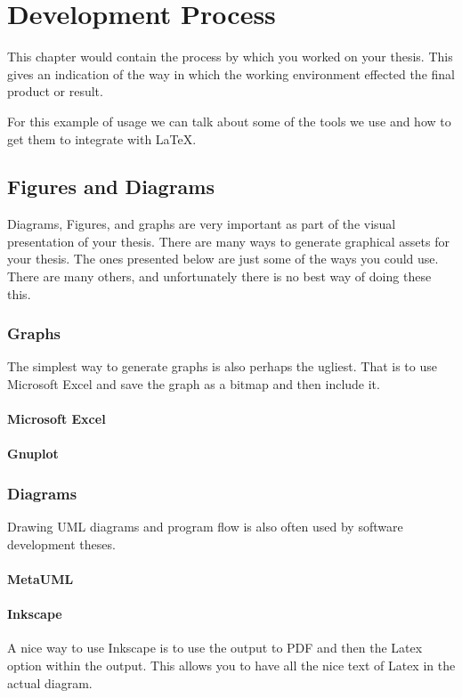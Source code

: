 \chapter{Development Process}
\label{chap:process}

This chapter would contain the process by which you worked on your thesis.  This gives an indication of the way in which the working environment effected the final product or result.

For this example of usage we can talk about some of the tools we use and how to get them to integrate with \LaTeX.

\section{Figures and Diagrams}
Diagrams, Figures, and graphs are very important as part of the visual presentation of your thesis.  There are many ways to generate graphical assets for your thesis. The ones presented below are just some of the ways you could use. There are many others, and unfortunately there is no best way of doing these this.

\subsection{Graphs}
The simplest way to generate graphs is also perhaps the ugliest.  That is to use Microsoft Excel and save the graph as a bitmap and then include it.

\subsubsection{Microsoft Excel}

\subsubsection{Gnuplot}

\subsection{Diagrams}
Drawing UML diagrams and program flow is also often used by software development theses.

\subsubsection{MetaUML}

\subsubsection{Inkscape}
A nice way to use Inkscape is to use the output to PDF and then the Latex option within the output.  This allows you to have all the nice text of Latex in the actual diagram. 






